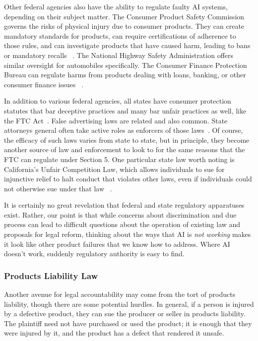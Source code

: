 \documentclass[acmconf,manuscript,screen,natbib=true]{acmart}
\begin{document}
Other federal agencies also have the ability to regulate faulty AI systems, depending on their subject matter. The Consumer Product Safety Commission governs the risks of physical injury due to consumer products. They can create mandatory standards for products, can require certifications of adherence to those rules, and can investigate products that have caused harm, leading to bans or mandatory recalls ~\cite{CPSC_about}. The National Highway Safety Administration offers similar oversight for automobiles specifically. The Consumer Finance Protection Bureau can regulate harms from products dealing with loans, banking, or other consumer finance issues ~\cite{CFPB_jx}. 

In addition to various federal agencies, all states have consumer protection statutes that bar deceptive practices and many bar unfair practices as well, like the FTC Act~\cite{NCLC_Report}. False advertising laws are related and also common. State attorneys general often take active roles as enforcers of those laws~\cite{citron2016privacy}. Of course, the efficacy of such laws varies from state to state, but in principle, they become another source of law and enforcement to look to for the same reasons that the FTC can regulate under Section 5. One particular state law worth noting is California's Unfair Competition Law, which allows individuals to sue for injunctive relief to halt conduct that violates other laws, even if individuals could not otherwise sue under that law ~\cite{Zhang}.

It is certainly no great revelation that federal and state regulatory apparatuses exist. Rather, our point is that while concerns about discrimination and due process can lead to difficult questions about the operation of existing law and proposals for legal reform, thinking about the ways that AI is \emph{not working} makes it look like other product failures that we know how to address. Where AI doesn't work, suddenly regulatory authority is easy to find.

\subsubsection{Products Liability Law}

Another avenue for legal accountability may come from the tort of products liability, though there are some potential hurdles. In general, if a person is injured by a defective product, they can sue the producer or seller in products liability. The plaintiff need not have purchased or used the product; it is enough that they were injured by it, and the product has a defect that rendered it unsafe.
\end{document}
